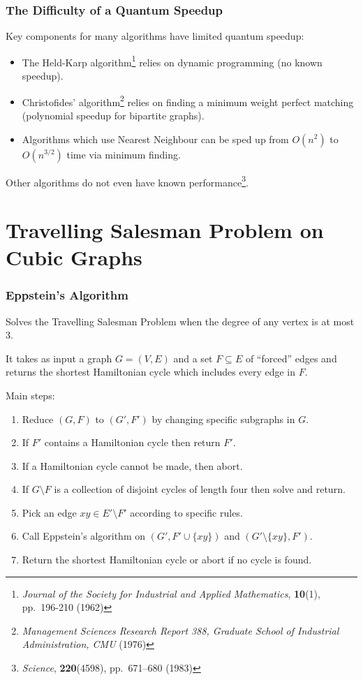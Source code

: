 \documentclass[]{beamer}
\begin{document}
\begin{frame}
\frametitle{The Difficulty of a Quantum Speedup}

Key components for many algorithms have limited quantum speedup:

\begin{itemize}
\item The Held-Karp algorithm\footnote{{\em Journal of the Society for Industrial and Applied Mathematics}, {\bf 10}(1), pp.\ 196-210 (1962)} relies on dynamic programming (no known speedup).
\item Christofides' algorithm\footnote{{\em Management Sciences Research Report 388, Graduate School of Industrial Administration, CMU} (1976)} relies on finding a minimum weight perfect matching (polynomial speedup for bipartite graphs).
\item Algorithms which use Nearest Neighbour can be sped up from $O(n^2)$ to $O(n^{3/2})$ time via minimum finding.
\end{itemize}

Other algorithms do not even have known performance\footnote{{\em Science}, {\bf 220}(4598), pp.\ 671--680 (1983)}.
\end{frame}

\section{Travelling Salesman Problem on Cubic Graphs}

\begin{frame}
\frametitle{Eppstein's Algorithm}
Solves the Travelling Salesman Problem when the degree of any vertex is at most $3$.

It takes as input a graph $G = (V, E)$ and a set $F \subseteq E$ of ``forced'' edges and returns the shortest Hamiltonian cycle which includes every edge in $F$.

Main steps:
\begin{enumerate}
\item Reduce $(G, F)$ to $(G', F')$ by changing specific subgraphs in $G$.
\item If $F'$ contains a Hamiltonian cycle then return $F'$.
\item If a Hamiltonian cycle cannot be made, then abort.
\item If $G \setminus F$ is a collection of disjoint cycles of length four then solve and return.
\item Pick an edge $xy \in E' \setminus F'$ according to specific rules.
\item Call Eppstein's algorithm on $(G', F' \cup \{xy\})$ and $(G' \setminus \{xy\}, F')$.
\item Return the shortest Hamiltonian cycle or abort if no cycle is found.
\end{enumerate}
\end{frame}
\end{document}
